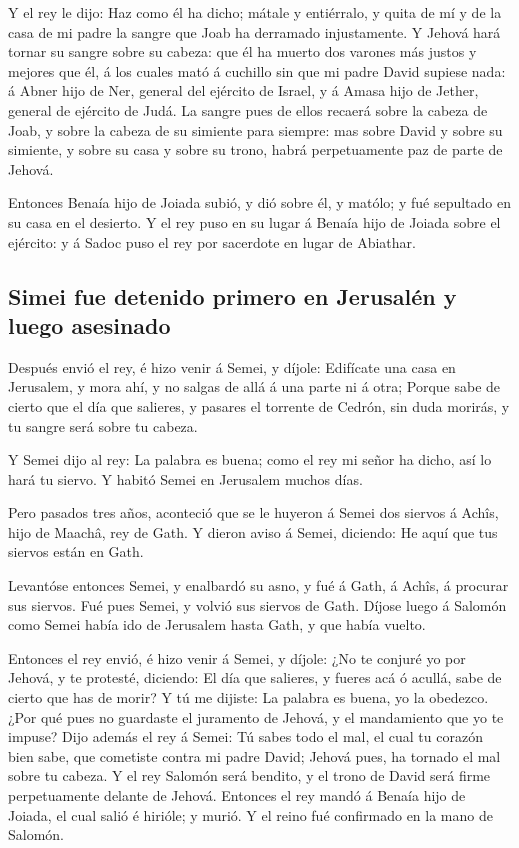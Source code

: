  Y el rey le dijo: Haz como él ha dicho; mátale y
entiérralo, y quita de mí y de la casa de mi padre la sangre que Joab ha
derramado injustamente.  Y Jehová hará tornar su sangre
sobre su cabeza: que él ha muerto dos varones más justos y mejores que
él, á los cuales mató á cuchillo sin que mi padre David supiese nada: á
Abner hijo de Ner, general del ejército de Israel, y á Amasa hijo de
Jether, general de ejército de Judá.  La sangre pues de
ellos recaerá sobre la cabeza de Joab, y sobre la cabeza de su simiente
para siempre: mas sobre David y sobre su simiente, y sobre su casa y
sobre su trono, habrá perpetuamente paz de parte de Jehová.

 Entonces Benaía hijo de Joiada subió, y dió sobre él, y
matólo; y fué sepultado en su casa en el desierto.  Y el
rey puso en su lugar á Benaía hijo de Joiada sobre el ejército: y á
Sadoc puso el rey por sacerdote en lugar de Abiathar.

\hypertarget{simei-fue-detenido-primero-en-jerusaluxe9n-y-luego-asesinado}{%
\subsection{Simei fue detenido primero en Jerusalén y luego
asesinado}\label{simei-fue-detenido-primero-en-jerusaluxe9n-y-luego-asesinado}}

 Después envió el rey, é hizo venir á Semei, y díjole:
Edifícate una casa en Jerusalem, y mora ahí, y no salgas de allá á una
parte ni á otra;  Porque sabe de cierto que el día que
salieres, y pasares el torrente de Cedrón, sin duda morirás, y tu sangre
será sobre tu cabeza.

 Y Semei dijo al rey: La palabra es buena; como el rey mi
señor ha dicho, así lo hará tu siervo. Y habitó Semei en Jerusalem
muchos días.

 Pero pasados tres años, aconteció que se le huyeron á
Semei dos siervos á Achîs, hijo de Maachâ, rey de Gath. Y dieron aviso á
Semei, diciendo: He aquí que tus siervos están en Gath.

 Levantóse entonces Semei, y enalbardó su asno, y fué á
Gath, á Achîs, á procurar sus siervos. Fué pues Semei, y volvió sus
siervos de Gath.  Díjose luego á Salomón como Semei había
ido de Jerusalem hasta Gath, y que había vuelto.

 Entonces el rey envió, é hizo venir á Semei, y díjole: ¿No
te conjuré yo por Jehová, y te protesté, diciendo: El día que salieres,
y fueres acá ó acullá, sabe de cierto que has de morir? Y tú me dijiste:
La palabra es buena, yo la obedezco.  ¿Por qué pues no
guardaste el juramento de Jehová, y el mandamiento que yo te impuse?
 Dijo además el rey á Semei: Tú sabes todo el mal, el cual
tu corazón bien sabe, que cometiste contra mi padre David; Jehová pues,
ha tornado el mal sobre tu cabeza.  Y el rey Salomón será
bendito, y el trono de David será firme perpetuamente delante de Jehová.
 Entonces el rey mandó á Benaía hijo de Joiada, el cual
salió é hirióle; y murió. Y el reino fué confirmado en la mano de
Salomón.

